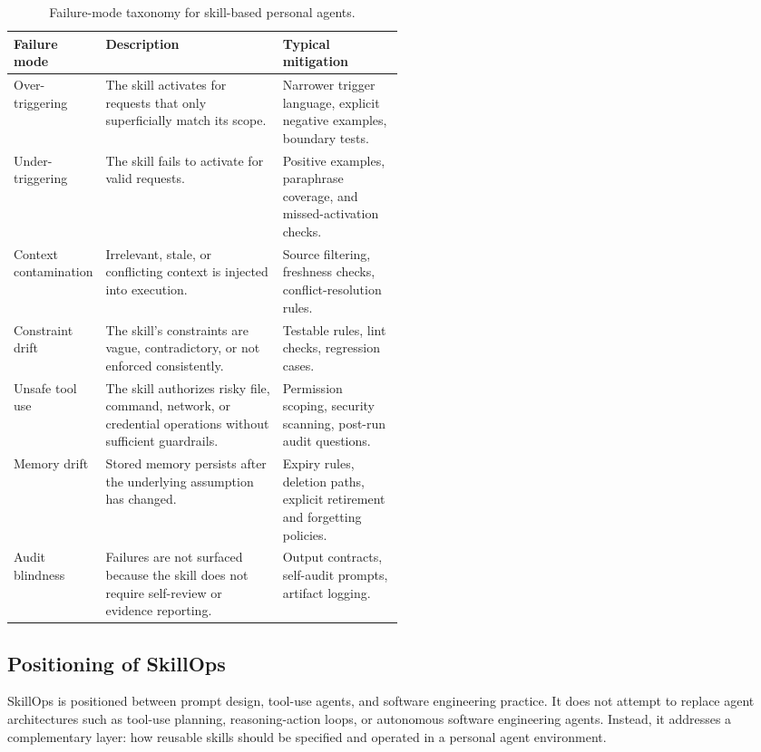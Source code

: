 \documentclass[11pt]{article}
\begin{document}
\begin{table}[t]
\centering
\footnotesize
\begin{tabularx}{\linewidth}{
    >{\raggedright\arraybackslash}p{0.19\linewidth}
    >{\raggedright\arraybackslash}X
    >{\raggedright\arraybackslash}p{0.31\linewidth}
}
\toprule
\textbf{Failure mode} & \textbf{Description} & \textbf{Typical mitigation} \\
\midrule
Over-triggering & The skill activates for requests that only superficially
match its scope. & Narrower trigger language, explicit negative examples,
boundary tests. \\
Under-triggering & The skill fails to activate for valid requests. & Positive
examples, paraphrase coverage, and missed-activation checks. \\
Context contamination & Irrelevant, stale, or conflicting context is injected
into execution. & Source filtering, freshness checks, conflict-resolution
rules. \\
Constraint drift & The skill's constraints are vague, contradictory, or not
enforced consistently. & Testable rules, lint checks, regression cases. \\
Unsafe tool use & The skill authorizes risky file, command, network, or
credential operations without sufficient guardrails. & Permission scoping,
security scanning, post-run audit questions. \\
Memory drift & Stored memory persists after the underlying assumption has
changed. & Expiry rules, deletion paths, explicit retirement and forgetting
policies. \\
Audit blindness & Failures are not surfaced because the skill does not require
self-review or evidence reporting. & Output contracts, self-audit prompts,
artifact logging. \\
\bottomrule
\end{tabularx}
\caption{Failure-mode taxonomy for skill-based personal agents.}
\label{tab:failure-modes}
\end{table}

\subsection{Positioning of SkillOps}

SkillOps is positioned between prompt design, tool-use agents, and software
engineering practice. It does not attempt to replace agent architectures such
as tool-use planning, reasoning-action loops, or autonomous software
engineering agents. Instead, it addresses a complementary layer: how reusable
skills should be specified and operated in a personal agent environment.
\end{document}
